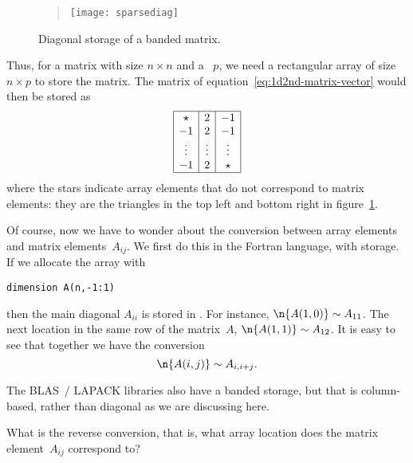 \begin{figure}[ht]
  \begin{quote}
    \texttt{[image: sparsediag]}
  \end{quote}
  \caption{Diagonal storage of a banded matrix.}
  \label{fig:sparsediag}
\end{figure}

Thus, for a matrix with size $n\times n$ and a
~$p$, we need a
rectangular array of size $n\times p$ to store the matrix. The matrix
of equation~\eqref{eq:1d2nd-matrix-vector} would then be stored as
\begin{equation}
\begin{array}{|c|c|c|}
  \hline
  \star&2&-1\\
  -1&2&-1\\
  \vdots&\vdots&\vdots\\
  -1&2&\star\\ \hline
\end{array}
\label{eq:2minus1-by-diagonals}
\end{equation}
where the stars indicate array elements that do not correspond to
matrix elements: they are the triangles in the top left and bottom
right in figure~\ref{fig:sparsediag}. 

Of course, now we have to wonder about the conversion between array
elements  and matrix elements~$A_{ij}$.
We first do this in the Fortran language, with  storage.
If we allocate the array with
\begin{verbatim}
dimension A(n,-1:1)
\end{verbatim}
then the main diagonal $A_{ii}$ is stored in . For instance,
%
$\n{A(1,0)}\sim A_{11}$. The next location in the same row of the matrix~$A$, 
%
$\n{A(1,1)}\sim A_{12}$. It is easy to see that together we have the
conversion
\begin{equation}
  \n{A(i,j)}\sim A_{i,i+j}.
  \label{eq:sparse-conversion}
\end{equation}

\begin{remark}
  The \ac{BLAS}~/ \ac{LAPACK} libraries also have a banded storage, but that
  is column-based, rather than diagonal as we are discussing here.
\end{remark}

\begin{exercise}
  What is the reverse conversion, that is, what array location
   does the matrix element~$A_{ij}$ correspond to?
\end{exercise}

